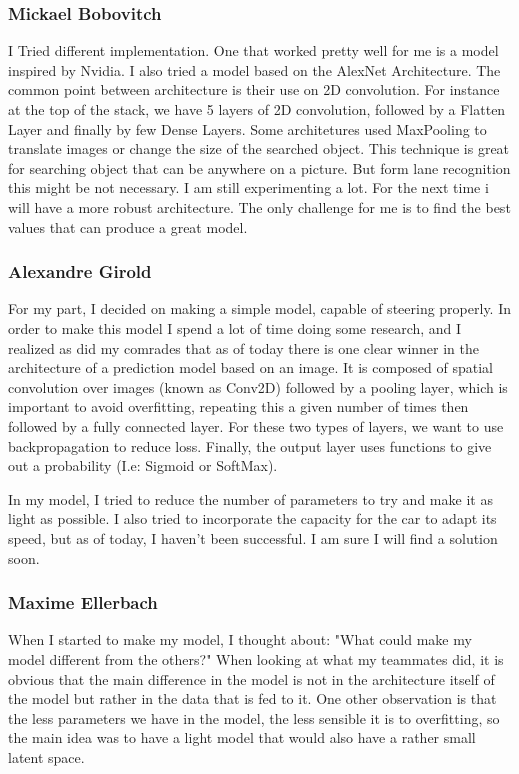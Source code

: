 \documentclass[12pt]{article}
\begin{document}
\subsubsection{Mickael Bobovitch}
I Tried different implementation. One that worked pretty well for me is a model inspired by Nvidia. I also tried a model based on the AlexNet Architecture. The common point between architecture is their use on 2D convolution. For instance at the top of the stack, we have 5 layers of 2D convolution, followed by a Flatten Layer and finally by few Dense Layers. Some architetures used MaxPooling to translate images or change the size of the searched object. This technique is great for searching object that can be anywhere on a picture. But form lane recognition this might be not necessary. I am still experimenting a lot. For the next time i will have a more robust architecture. The only challenge for me is to find the best values that can produce a great model.

\subsubsection{Alexandre Girold}
For my part, I decided on making a simple model, capable of steering properly. In order to make this model I spend a lot of time doing some research, and I realized as did my comrades that as of today there is one clear winner in the architecture of a prediction model based on an image. 
It is composed of spatial convolution over images (known as Conv2D) followed by a pooling layer, which is important to avoid overfitting, repeating this a given number of times then followed by a fully connected layer. For these two types of layers, we want to use backpropagation to reduce loss. Finally, the output layer uses functions to give out a probability (I.e: Sigmoid or SoftMax).  

In my model, I tried to reduce the number of parameters to try and make it as light as possible. I also tried to incorporate the capacity for the car to adapt its speed, but as of today, I haven’t been successful. I am sure I will find a solution soon.

\newpage

\subsubsection{Maxime Ellerbach}
When I started to make my model, I thought about: "What could make my model different from the others?" When looking at what my teammates did, it is obvious that the main difference in the model is not in the architecture itself of the model but rather in the data that is fed to it. One other observation is that the less parameters we have in the model, the less sensible it is to overfitting, so the main idea was to have a light model that would also have a rather small latent space. \\
\end{document}
